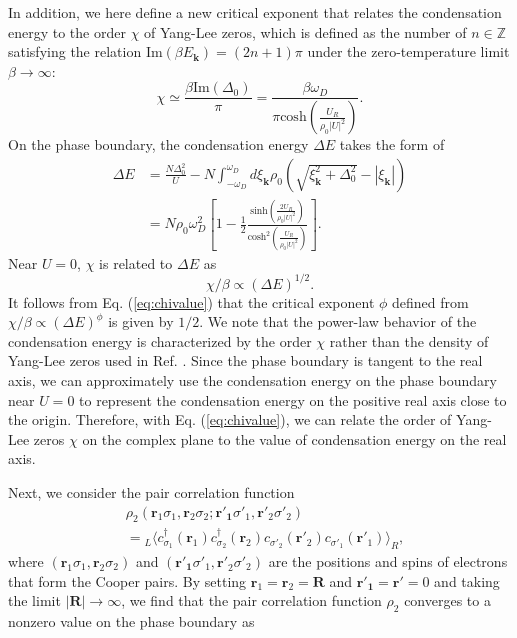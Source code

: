 \documentclass[aps,prl,twocolumn,nofootinbib,superscriptaddress,notitlepage,longbibliography]{revtex4-1}
\begin{document}
	In addition, we here define a new critical exponent that relates the condensation energy to the order $\chi$ of Yang-Lee zeros,
	which is defined as the number of $n\in\mathbb{Z}$ satisfying the relation
	$\mathrm{Im}(\beta E_{\bm{k}})=(2n+1)\pi$ under the zero-temperature limit $\beta\to\infty$:
	\begin{equation}
	\chi\simeq\frac{\beta\text{Im}(\Delta_{0})}{\pi}=\frac{\beta\omega_{D}}{\pi\text{cosh}(\frac{U_{R}}{\rho_{0}|U|^{2}})}.
	\end{equation}
	  On the phase boundary, the condensation energy $\Delta E$ takes the form of
	 \begin{align}
	 \Delta E&=  \frac{N\Delta_0^2}{U}
	 - N \int_{- \omega_D}^{\omega_D} d \xi_{\bm{k}} \rho_0 \left( \sqrt{\xi_{\bm{k}}^2 +
	 	\Delta_0^2} - | \xi_{\bm{k}} | \right)\nonumber\\
	 &=N \rho_0 \omega_D^2 \left[ 1 - \frac{1}{2} \frac{\text{sinh} \left(\frac{2 U_R}{\rho_0 | U |^2} \right)}{\text{cosh}^2 \left( \frac{U_R}{\rho_0| U |^2} \right)} \right].
	 \end{align}
	 Near $U=0$, $\chi$ is related to $\Delta E$ as
	\begin{equation}
	\chi/\beta\propto(\Delta E)^{1/2}.
	\label{eq:chivalue}
	\end{equation}
	 It follows from Eq. (\ref{eq:chivalue}) that the critical exponent $\phi$ defined from $\chi/\beta\propto(\Delta E)^{\phi}$ is given by $1/2$. We note that the power-law behavior of the condensation energy is characterized by the order $\chi$ rather than the density of Yang-Lee zeros used in Ref. \cite{Fisher:1978vn}. Since the phase boundary is tangent to the real axis, we can approximately use the condensation energy on the phase boundary near $U=0$ to represent the condensation energy on the positive real axis close to the origin. Therefore, with Eq. (\ref{eq:chivalue}), we can relate the order of Yang-Lee zeros $\chi$ on the complex plane to the value of condensation energy on the real axis. 
	
	Next, we consider the pair correlation function
	\begin{align}
	&\rho_{2}(\bm{r}_{1}\sigma_{1},\bm{r}_{2}\sigma_{2};\bm{r'_{1}}\sigma'_{1},\bm{r'}_{2}\sigma'_{2})\nonumber\\
	&={}_{L}\langle c_{\sigma_{1}}^{\dagger}(\bm{r}_{1})c_{\sigma_{2}}^{\dagger}(\bm{r}_{2})c_{\sigma'_{2}}(\bm{r'}_{2})c_{\sigma'_{1}}(\bm{r'}_{1})\rangle_{R},
	\end{align}
	where $(\bm{r}_{1}\sigma_{1},\bm{r}_{2}\sigma_{2})$ and $(\bm{r'_{1}}\sigma'_{1},\bm{r'}_{2}\sigma'_{2})$ are the positions and spins of electrons that form the Cooper pairs. By setting
	$\bm{r}_{1}=\bm{r}_{2}=\bm{R}$ and $\bm{r'_{1}}=\bm{r'}=0$ and taking
	the limit $|\bm{R}|\rightarrow\infty$, we find that the pair correlation function
	$\rho_2$ converges to a nonzero value on the phase boundary as
	
\end{document}
